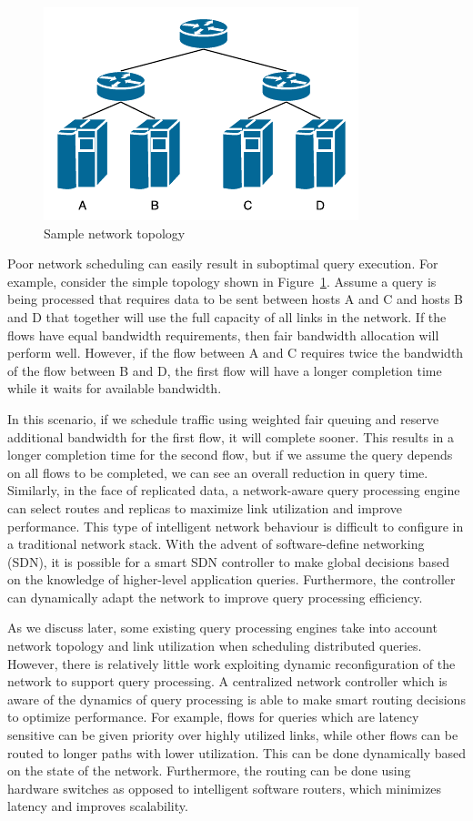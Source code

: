 \documentclass{acm_proc_article-sp}
\begin{document}
\begin{figure}
    \centering
    \includegraphics{figures/sample-topology.pdf}
    \caption{Sample network topology}\label{fig:sample-topology}
\end{figure}

Poor network scheduling can easily result in suboptimal query execution.
For example, consider the simple topology shown in Figure~\ref{fig:sample-topology}.
Assume a query is being processed that requires data to be sent between hosts A and C and hosts B and D that together will use the full capacity of all links in the network.
If the flows have equal bandwidth requirements, then fair bandwidth allocation will perform well.
However, if the flow between A and C requires twice the bandwidth of the flow between B and D, the first flow will have a longer completion time while it waits for available bandwidth.

In this scenario, if we schedule traffic using weighted fair queuing and reserve additional bandwidth for the first flow, it will complete sooner.
This results in a longer completion time for the second flow, but if we assume the query depends on all flows to be completed, we can see an overall reduction in query time.
Similarly, in the face of replicated data, a network-aware query processing engine can select routes and replicas to maximize link utilization and improve performance.
This type of intelligent network behaviour is difficult to configure in a traditional network stack.
With the advent of software-define networking (SDN), it is possible for a smart SDN controller to make global decisions based on the knowledge of higher-level application queries.
Furthermore, the controller can dynamically adapt the network to improve query processing efficiency.

As we discuss later, some existing query processing engines take into account network topology and link utilization when scheduling distributed queries.
However, there is relatively little work exploiting dynamic reconfiguration of the network to support query processing.
A centralized network controller which is aware of the dynamics of query processing is able to make smart routing decisions to optimize performance.
For example, flows for queries which are latency sensitive can be given priority over highly utilized links, while other flows can be routed to longer paths with lower utilization.
This can be done dynamically based on the state of the network.
Furthermore, the routing can be done using hardware switches as opposed to intelligent software routers, which minimizes latency and improves scalability.
\end{document}
